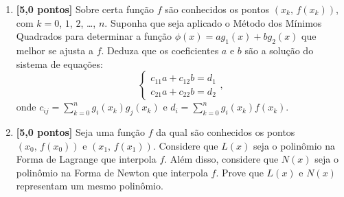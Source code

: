 \documentclass[11pt,a4paper]{article}
\begin{document}
\begin{enumerate}
 \item \textbf{[5,0 pontos]} Sobre certa função $f$ são conhecidos os pontos $(x_k,\,f(x_k))$, com $k=0$, $1$, $2$, \ldots, $n$. Suponha que seja 
aplicado o Método dos Mínimos Quadrados para determinar a função $\phi(x) = ag_1(x) + bg_2(x)$ que melhor se ajusta a $f$. Deduza que os coeficientes $a$ e 
$b$ são a solução do sistema de equações:
$$\begin{cases}
   c_{11}a + c_{12}b = d_1 \\
   c_{21}a + c_{22}b = d_2
  \end{cases},
$$
onde $\displaystyle c_{ij} = \sum_{k=0}^n g_i(x_k)g_j(x_k)$ e $\displaystyle d_{i} = \sum_{k=0}^n g_i(x_k)f(x_k)$.

 \item \textbf{[5,0 pontos]} Seja uma função $f$ da qual são conhecidos os pontos $(x_0,\,f(x_0))$ e $(x_1,\,f(x_1))$. Considere que 
$L(x)$ seja o polinômio na Forma de Lagrange que interpola $f$. Além disso, considere que $N(x)$ seja o polinômio na Forma de Newton que 
interpola $f$. Prove que $L(x)$ e $N(x)$ representam um mesmo polinômio. 

\end{enumerate}
\end{document}
